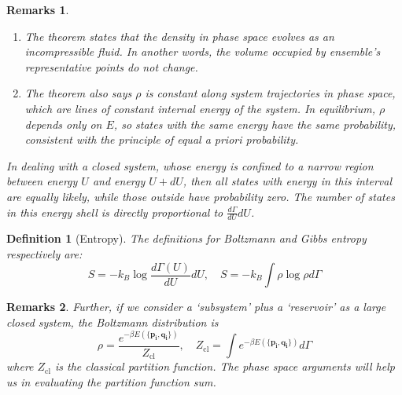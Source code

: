 \documentclass[a4paper]{article}
\newtheorem{remarks}{Remarks}[section]
\theoremstyle{new}
\newtheorem{defi}{Definition}[section]
\begin{document}
\begin{remarks}\leavevmode
\begin{enumerate}
    \item The theorem states that the density in phase space evolves as an incompressible fluid. In another words, the volume occupied by ensemble's representative points do not change. 
    \item The theorem also says $\rho$ is constant along system trajectories in phase space, which are lines of constant internal energy of the system. In equilibrium, $\rho$ depends only on $E$, so states with the same energy have the same probability, consistent with the principle of equal a priori probability.
\end{enumerate}
In dealing with a closed system, whose energy is confined to a narrow region between energy $U$ and energy $U+dU$, then all states with energy in this interval are equally likely, while those outside have probability zero. The number of states in this energy shell is directly proportional to $\frac{d\Gamma}{dU}dU$.
\end{remarks}
\begin{defi}[Entropy]
The definitions for Boltzmann and Gibbs entropy respectively are:
\begin{equation}
S=-k_B\log\frac{d\Gamma(U)}{dU}dU,\quad S=-k_B\int\rho\log\rho d\Gamma\label{entropyphase}
\end{equation}
\end{defi}
\begin{remarks}
Further, if we consider a `subsystem' plus a `reservoir' as a large closed system, the Boltzmann distribution is 
$$\rho=\frac{e^{-\beta E(\{\mathbf{p_i},\mathbf{q_i}\})}}{Z_{\text{cl}}},\quad Z_{\text{cl}}=\int e^{-\beta E(\{\mathbf{p_i},\mathbf{q_i}\})}d\Gamma$$
where $Z_{\text{cl}}$ is the classical partition function. The phase space arguments will help us in evaluating the partition function sum.
\end{remarks}
\newpage
\end{document}
